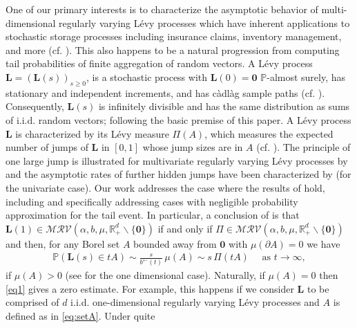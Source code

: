 \documentclass[aos]{imsart}
\numberwithin{equation}{section}
\theoremstyle{plain} %
\theoremstyle{remark}
\renewcommand\P{\mathbb{P}}
\newcommand{\R}{\mathbb{R}}
\def\MRV{\mathcal{MRV}}
\def\bzero{\boldsymbol 0}
\def\bL{\boldsymbol L}
\begin{document}
One of our primary interests  is to characterize the asymptotic behavior of multi-dimensional regularly varying L\'evy processes which have inherent applications to stochastic storage processes including insurance claims, inventory management, and more (cf. \cite{prabhu:1998,asmussen:2003}). This also happens to be  a natural progression from computing tail probabilities of finite aggregation of random vectors. A L\'evy process $\bL=(\bL(s))_{s\geq 0}$,
is a stochastic process    with $\bL(0)=\bzero$ $\mathbb{P}$-almost surely, has stationary and independent increments, and has c\`adl\`ag sample paths (cf. \cite{sato:1999}). Consequently, $\bL(s)$ is infinitely divisible and has
the same distribution as sums of i.i.d. random vectors; following the basic premise of this paper. A L\'evy process $\bL$ is characterized by its L\'evy measure $\Pi(A)$, which measures the expected
number of jumps of $\bL$ in $[0,1]$ whose jump sizes are in $A$ (cf. ).
The principle of one large jump is illustrated for multivariate regularly varying L\'evy processes by \citet{hult:lindskog:2005SPA,hult:lindskog:2006b} and the asymptotic rates of further hidden jumps have been characterized by  \citet{lindskog:resnick:roy:2014} (for the univariate case).
Our work addresses the case where the results of \cite{hult:lindskog:2006b} hold, including and specifically addressing cases with negligible probability approximation for the tail event.
{In particular,} a conclusion of \cite[Proposition 3.1]{hult:lindskog:2006b}  is that
$\bL(1)\in\MRV(\alpha, b, \mu, \R_+^d\backslash\{\bzero\})$ if and only if
 $\Pi
\in\MRV(\alpha, b, \mu, \R_+^d\backslash\{\bzero\})$ and then, for any Borel set $A$ bounded away from $\bzero$ with $\mu(\partial A)=0$  we have
\begin{eqnarray} \label{eq1}
    \P(\bL(s)\in tA) \sim  \frac{s}{b^{\leftarrow}(t)}\,\mu(A)\sim  s\,\Pi(tA) \quad \text{ as } t\to\infty,
\end{eqnarray}
if $\mu(A)>0$ (see \cite{embrechts:goldie:veraverbeke:1979} for the one dimensional case). Naturally, if $\mu(A)=0$ then \eqref{eq1} gives a zero estimate. For example, this  happens if we consider $\bL$ to be comprised of $d$ i.i.d. one-dimensional regularly varying L\'evy processes and $A$ is defined as in \eqref{eq:setA}.  Under quite
\end{document}
